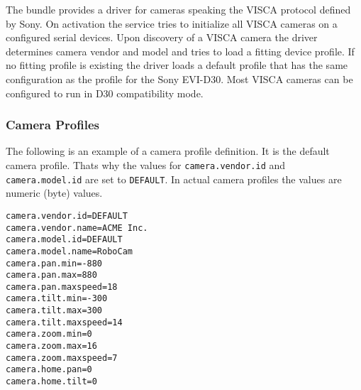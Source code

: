 
The bundle provides a driver for cameras speaking the VISCA protocol defined by Sony. On activation the service tries to initialize all VISCA cameras on a configured serial devices. Upon discovery of a VISCA camera the driver determines camera vendor and model and tries to load a fitting device profile. If no fitting profile is existing the driver loads a default profile that has the same configuration as the profile for the Sony EVI-D30. Most VISCA cameras can be configured to run in D30 compatibility mode. 

\configproperties


\subsubsection{Camera Profiles}

The following is an example of a camera profile definition. It is the default camera profile. Thats why the values for \texttt{camera.vendor.id} and \texttt{camera.model.id} are set to \texttt{DEFAULT}. In actual camera profiles the values are numeric (byte) values.

\begin{verbatim}
camera.vendor.id=DEFAULT
camera.vendor.name=ACME Inc.
camera.model.id=DEFAULT
camera.model.name=RoboCam
camera.pan.min=-880
camera.pan.max=880
camera.pan.maxspeed=18
camera.tilt.min=-300
camera.tilt.max=300
camera.tilt.maxspeed=14
camera.zoom.min=0
camera.zoom.max=16
camera.zoom.maxspeed=7
camera.home.pan=0
camera.home.tilt=0
\end{verbatim}
